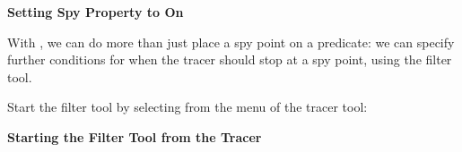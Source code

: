 \begin{center}

\vspace{2mm}
{\bf Setting Spy Property to On}
\end{center}

With {\tkeclipse}, we can do more than just place a spy point on a
predicate: we can specify further conditions for when the tracer should
stop at a spy point, using the filter tool. 

Start the filter tool by selecting  from the  menu of the tracer
tool:

\begin{center}

\vspace{3mm}
{\bf Starting the Filter Tool from the Tracer}
\end{center}

